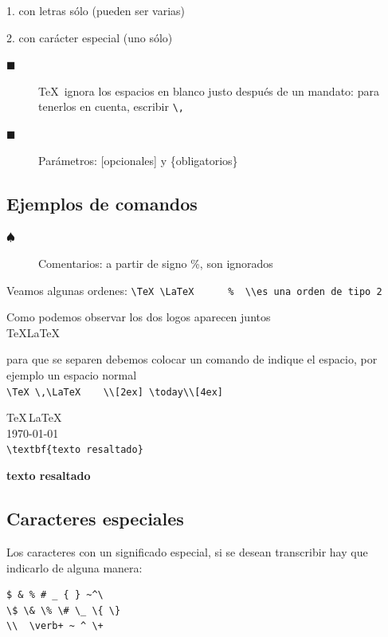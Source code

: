 1. con letras s\'{o}lo (pueden ser varias)

2. con car\'{a}cter especial (uno s\'{o}lo)

\begin{description}
\item[$\blacksquare$]  \TeX \, ignora los espacios en blanco justo despu\'{e}s de
un mandato: para tenerlos en cuenta, escribir \lstinline+\,+

\item[$\blacksquare$] Par\'{a}metros: [opcionales] y \{obligatorios\}
\end{description}

\subsection{Ejemplos de comandos}

\begin{description}
\item[$\spadesuit$] Comentarios: a partir de signo \%, son ignorados
\end{description}

Veamos algunas ordenes:
\lstinline+\TeX \LaTeX      %  \\es una orden de tipo 2+\par
Como podemos observar los dos logos aparecen juntos \\
\TeX \LaTeX  \par    %
para que se separen debemos colocar un comando de indique el espacio, por ejemplo un espacio normal\\
\lstinline+\TeX \,\LaTeX    \\[2ex] \today\\[4ex]+\par
\TeX \,\LaTeX     \\[2ex]
\today\\[4ex]

\lstinline+\textbf{texto resaltado}+\par

\textbf{texto resaltado}


\subsection{Caracteres especiales}

Los caracteres con un significado especial, si se desean transcribir hay que
indicarlo de alguna manera:
\begin{verbatim}
$ & % # _ { } ~^\
\$ \& \% \# \_ \{ \}
\\  \verb+ ~ ^ \+
\end{verbatim}





